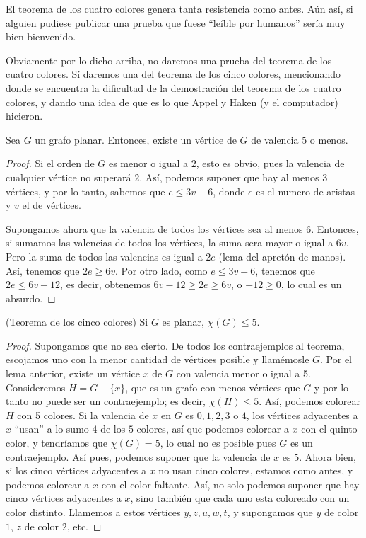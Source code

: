 \begin{section}{El teorema de los cuatro colores}
genera tanta resistencia como antes. Aún así, si alguien pudiese publicar una prueba que fuese ``leíble por humanos'' sería muy bien bienvenido.

Obviamente por lo dicho arriba, no daremos una prueba del teorema de los cuatro colores. Sí daremos una del teorema de los cinco colores, mencionando donde se encuentra la dificultad de la demostración del teorema de los  cuatro colores, y dando una idea de que es lo que Appel y Haken (y el computador) hicieron. 

\begin{lema} \label{lA4.3.1} Sea $G$ un grafo planar. Entonces, existe un vértice de $G$ de valencia $5$ o menos.
\end{lema}
\begin{proof} Si el orden de $G$ es menor o igual a $2$, esto es obvio, pues la valencia de cualquier vértice no superará $2$. Así, podemos suponer que hay al menos $3$ vértices, y por lo tanto, sabemos que $e\le 3v-6$, donde $e$ es el numero de aristas y $v$ el de vértices.

Supongamos ahora que la valencia de todos los vértices sea al menos $6$. Entonces, si sumamos las valencias de todos los vértices, la suma sera mayor o igual a $6v$. Pero la suma de todos las
valencias es igual a $2e$ (lema del apretón de manos). Así, tenemos que $2e\ge 6v$. Por otro lado, como $e\le 3v-6$, tenemos que $2e\le 6v-12$, es decir, obtenemos $6v-12\ge 2e\ge 6v$, o $-12\ge 0$, lo cual es un absurdo.
\end{proof}

\begin{teorema}\label{tA4.3.1}(Teorema de los cinco colores) Si $G$ es planar, $\chi (G)\le 5$.
\end{teorema}
\begin{proof}
 Supongamos que no sea cierto. De todos los contraejemplos al teorema, escojamos uno con la menor cantidad de
vértices posible y llamémosle $G$. Por el lema anterior, existe un vértice $x$ de $G$ con valencia menor o igual a 5. Consideremos $H=G-\{x\}$, que es un grafo con menos vértices que $G$ y por lo tanto no puede ser un contraejemplo; es decir, $\chi (H)\le 5$. Así, podemos colorear $H$ con 5 colores. Si la valencia de $x$ en $G$ es $0,1,2,3$ o $4$, los vértices adyacentes a $x$ ``usan'' a lo sumo $4$ de los $5$ colores, así que podemos colorear a $x$ con el quinto color, y tendríamos que $\chi (G)=5$, lo cual no es posible pues $G$ es un contraejemplo. Así pues, podemos suponer que la valencia de $x$ es $5$. Ahora bien, si los cinco vértices adyacentes a $x$ no usan cinco colores, estamos como antes, y podemos colorear a $x$ con el color faltante. Así, no solo podemos suponer que hay cinco vértices adyacentes a $x$, sino también que cada uno esta coloreado con un color distinto. Llamemos a estos vértices $y,z,u,w,t$, y supongamos que $y$ de color $1$, $z$ de color $2$, etc.


\end{proof}
\end{section}
